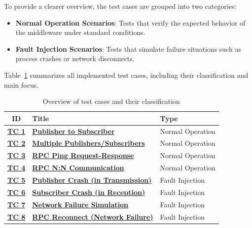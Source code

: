 \vspace{1em}
To provide a clearer overview, the test cases are grouped into two categories:

\begin{itemize}
	\item \textbf{Normal Operation Scenarios}: Tests that verify the expected behavior of the middleware under standard conditions.
	\item \textbf{Fault Injection Scenarios}: Tests that simulate failure situations such as process crashes or network disconnects.
\end{itemize}

\vspace{0.3em}
Table~\ref{tab:test_case_overview} summarizes all implemented test cases, including their classification and main focus.
\begin{table}[H]
	\renewcommand{\arraystretch}{1.45}
	\setlength{\tabcolsep}{10pt}
	\centering
	\begin{tabular}{|c|l|l|}
		\hline
		\textbf{ID} & \textbf{Title} & \textbf{Type} \\
		\hline
		\textbf{\hyperref[sec:tc1]{TC 1}} & \textbf{\hyperref[sec:tc1]{Publisher to Subscriber}} & Normal Operation \\
		\hline
		\textbf{\hyperref[sec:tc2]{TC 2}} & \textbf{\hyperref[sec:tc2]{Multiple Publishers/Subscribers}} & Normal Operation \\
		\hline
		\textbf{\hyperref[sec:tc3]{TC 3}} & \textbf{\hyperref[sec:tc3]{RPC Ping Request-Response}} & Normal Operation \\
		\hline
		\textbf{\hyperref[sec:tc4]{TC 4}} & \textbf{\hyperref[sec:tc4]{RPC N:N Communication}} & Normal Operation \\
		\hline
		\textbf{\hyperref[sec:tc5]{TC 5}} & \textbf{\hyperref[sec:tc5]{Publisher Crash (in Transmission)}} & Fault Injection \\
		\hline
		\textbf{\hyperref[sec:tc6]{TC 6}} & \textbf{\hyperref[sec:tc6]{Subscriber Crash (in Reception)}} & Fault Injection \\
		\hline
		\textbf{\hyperref[sec:tc7]{TC 7}} & \textbf{\hyperref[sec:tc7]{Network Failure Simulation}} & Fault Injection \\
		\hline
		\textbf{\hyperref[sec:tc8]{TC 8}} & \textbf{\hyperref[sec:tc8]{RPC Reconnect (Network Failure)}} & Fault Injection \\
		\hline
	\end{tabular}
	\caption{Overview of test cases and their classification}
	\label{tab:test_case_overview}
\end{table}


